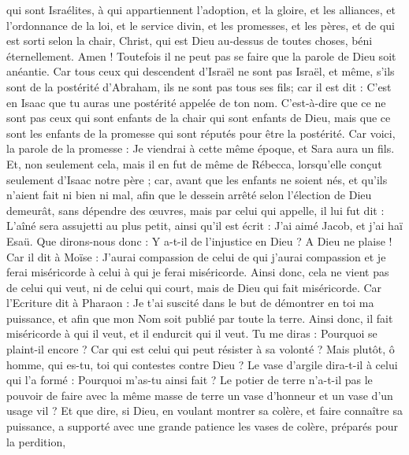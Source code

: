 \begin{multicols}{2}
qui sont Israélites, à qui appartiennent l'adoption, et la gloire, et les alliances, et l'ordonnance de la loi, et le service divin,
et les promesses, et les pères, et de qui est sorti selon la chair, Christ, qui est Dieu au-dessus de toutes choses, béni éternellement. Amen !
Toutefois il ne peut pas se faire que la parole de Dieu soit anéantie. Car tous ceux qui descendent d'Israël ne sont pas Israël,
et même, s'ils sont de la postérité d'Abraham, ils ne sont pas tous ses fils; car il est dit : C'est en Isaac que tu auras une postérité appelée de ton nom.
C'est-à-dire que ce ne sont pas ceux qui sont enfants de la chair qui sont enfants de Dieu, mais que ce sont les enfants de la promesse qui sont réputés pour être la postérité.
Car voici, la parole de la promesse : Je viendrai à cette même époque, et Sara aura un fils.
Et, non seulement cela, mais il en fut de même de Rébecca, lorsqu'elle conçut seulement d'Isaac notre père ;
car, avant que les enfants ne soient nés, et qu'ils n'aient fait ni bien ni mal, afin que le dessein arrêté selon l'élection de Dieu demeurât, sans dépendre des œuvres, mais par celui qui appelle, 
il lui fut dit : L'aîné sera assujetti au plus petit, ainsi qu'il est écrit :
J'ai aimé Jacob, et j'ai haï Esaü.
Que dirons-nous donc : Y a-t-il de l'injustice en Dieu ? A Dieu ne plaise !
Car il dit à Moïse : J'aurai compassion de celui de qui j'aurai compassion et je ferai miséricorde à celui à qui je ferai miséricorde.
Ainsi donc, cela ne vient pas de celui qui veut, ni de celui qui court, mais de Dieu qui fait miséricorde.
Car l'Ecriture dit à Pharaon : Je t'ai suscité dans le but de démontrer en toi ma puissance, et afin que mon Nom soit publié par toute la terre.
Ainsi donc, il fait miséricorde à qui il veut, et il endurcit qui il veut.
Tu me diras : Pourquoi se plaint-il encore ? Car qui est celui qui peut résister à sa volonté ?
Mais plutôt, ô homme, qui es-tu, toi qui contestes contre Dieu ? Le vase d'argile dira-t-il à celui qui l'a formé : Pourquoi m'as-tu ainsi fait ?
Le potier de terre n'a-t-il pas le pouvoir de faire avec la même masse de terre un vase d'honneur et un vase d'un usage vil ?
Et que dire, si Dieu, en voulant montrer sa colère, et faire connaître sa puissance, a supporté avec une grande patience les vases de colère, préparés pour la perdition,

\end{multicols}
